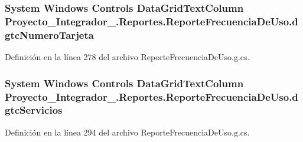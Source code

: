 \hypertarget{class_proyecto___integrador__3_1_1_reportes_1_1_reporte_frecuencia_de_uso_a3c20691f91322ac840de110154029356}{
\subsubsection[{dgtc\-Numero\-Tarjeta}]{\setlength{\rightskip}{0pt plus 5cm}System Windows Controls Data\-Grid\-Text\-Column Proyecto\-\_\-\-Integrador\-\_.\-Reportes.\-Reporte\-Frecuencia\-De\-Uso.\-dgtc\-Numero\-Tarjeta\hspace{0.3cm}{\ttfamily [package]}}}\label{class_proyecto___integrador__3_1_1_reportes_1_1_reporte_frecuencia_de_uso_a3c20691f91322ac840de110154029356}


Definición en la línea 278 del archivo Reporte\-Frecuencia\-De\-Uso.\-g.\-cs.

\hypertarget{class_proyecto___integrador__3_1_1_reportes_1_1_reporte_frecuencia_de_uso_ace0842b0e456ad2ad1cf360884b6c699}{
\subsubsection[{dgtc\-Servicios}]{\setlength{\rightskip}{0pt plus 5cm}System Windows Controls Data\-Grid\-Text\-Column Proyecto\-\_\-\-Integrador\-\_.\-Reportes.\-Reporte\-Frecuencia\-De\-Uso.\-dgtc\-Servicios\hspace{0.3cm}{\ttfamily [package]}}}\label{class_proyecto___integrador__3_1_1_reportes_1_1_reporte_frecuencia_de_uso_ace0842b0e456ad2ad1cf360884b6c699}


Definición en la línea 294 del archivo Reporte\-Frecuencia\-De\-Uso.\-g.\-cs.

